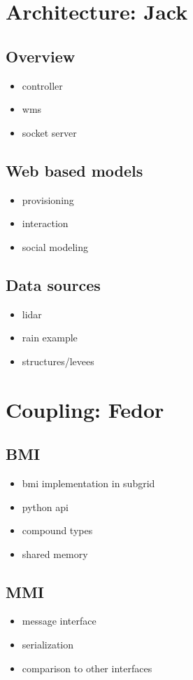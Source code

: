 \documentclass[a4paper]{article}
\begin{document}
\section{Architecture: Jack}
\subsection{Overview}
\begin{itemize}
  \item controller
  \item wms
  \item socket server
\end{itemize}
\subsection{Web based models}
\begin{itemize}
  \item provisioning
  \item interaction
  \item social modeling
\end{itemize}
\subsection{Data sources}
\begin{itemize}
  \item lidar
  \item rain example
  \item structures/levees
\end{itemize}

\section{Coupling: Fedor}
\subsection{BMI}
\begin{itemize}
  \item bmi implementation in subgrid
  \item python api
  \item compound types
  \item shared memory
\end{itemize}
\subsection{MMI}
\begin{itemize}
  \item message interface
  \item serialization
  \item comparison to other interfaces
\end{itemize}
\end{document}
